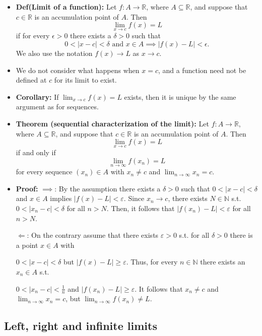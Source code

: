 \documentclass{article}
\begin{document}
\begin{itemize}
    \item \textbf{Def(Limit of a function):} Let $f: A \to \mathbb{R}$, where $A \subseteq \mathbb{R}$, and suppose that $c \in \mathbb{R}$ is an accumulation point of $A$. Then 
    \[
    \lim_{x \to c} f(x) = L 
    \]
    if for every $\epsilon > 0$ there exists a $\delta > 0$ such that 
    \[
    0 < |x - c| < \delta \text{ and } x \in A \implies |f(x) - L| < \epsilon.
    \] 
    We also use the notation $f(x) \to L$ as $x \to c$. 
    \item We do not consider what happens when $x = c$, and a function need not be defined at $c$ for its limit to exist. 
    \item \textbf{Corollary:} If $\displaystyle \lim_{x \to c} f(x) = L$ exists, then it is unique by the same argument as for sequences.

    \item \textbf{Theorem (sequential characterization of the limit):} Let $f: A \to \mathbb{R}$, where $A \subseteq \mathbb{R}$, and suppose that $c \in \mathbb{R}$ is an accumulation point of $A$. Then 
    \[
    \displaystyle \lim_{x \to c} f(x) = L
    \]
    if and only if
    \[
    \lim_{n \to \infty} f(x_n) = L
    \]
    for every sequence $(x_n) \in A$ with $x_n \neq c$ and $\displaystyle \lim_{n \to \infty} x_n = c $.
    \item \textbf{Proof:} $\implies$: By the assumption there exists a $\delta > 0$ such that $0 < |x - c| < \delta$ and $x \in A$ implies $|f(x) - L| < \varepsilon$. Since $x_n \to c$, there exists $N \in \mathbb{N}$ s.t. $0 < |x_n - c| < \delta$ for all $n > N$. Then, it follows that $|f(x_n) - L| < \varepsilon$ for all $n > N$.
    
    $\Longleftarrow$: On the contrary assume that there exists $\varepsilon > 0$ s.t. for all $\delta > 0$ there is a point $x \in A$ with
    
    $0 < |x - c| < \delta$ but $|f(x) - L| \geq \varepsilon$. Thus, for every $n \in \mathbb{N}$ there exists an $x_n \in A$ s.t.

    $0 < |x_n - c| < \frac{1}{n}$ and $|f(x_n) - L| \geq \varepsilon$. It follows that $x_n \neq c$ and $\displaystyle \lim_{n \to \infty}x_n = c$, but $\displaystyle \lim_{n \to \infty} f(x_n) \neq L$.
\end{itemize}

\subsection{Left, right and infinite limits}
\end{document}
